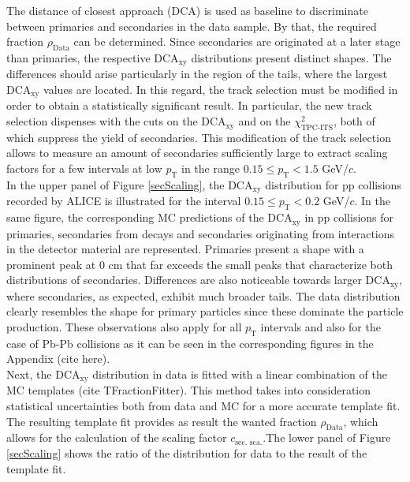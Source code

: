 \documentclass[12pt,a4paper]{report}
\begin{document}
The distance of closest approach (DCA) is used as baseline to discriminate between primaries and secondaries in the data sample. By that, the required fraction $\rho_\text{Data}$ can be determined. Since secondaries are originated at a later stage than primaries, the respective DCA$_{\text{xy}}$ distributions present distinct shapes. The differences should arise particularly in the region of the tails, where the largest DCA$_{\text{xy}}$ values are located. In this regard, the track selection must be modified in order to obtain a statistically significant result. In particular, the new track selection dispenses with the cuts on the DCA$_\text{xy}$ and on the  $\chi^2_\text{TPC-ITS}$, both of which suppress the yield of secondaries. This modification of the track selection allows to measure an amount of secondaries sufficiently large to extract scaling factors for a few intervals at low $p_\text{T}$ in the range $0.15 \leq p_\text{T} < 1.5 $ GeV/$c$.\\
In the upper panel of Figure \ref{secScaling}, the DCA$_{\text{xy}}$ distribution for pp collisions recorded by ALICE is illustrated for the \pt interval $0.15 \leq p_\text{T} < 0.2 $ GeV/$c$. In the same figure, the corresponding MC predictions of the DCA$_{\text{xy}}$ in pp collisions for primaries, secondaries from decays and secondaries originating from interactions in the detector material are represented. Primaries present a shape with a prominent peak at $0$ cm that far exceeds the small peaks that characterize both distributions of secondaries. Differences are also noticeable towards larger DCA$_{\text{xy}}$, where secondaries, as expected, exhibit much broader tails. The data distribution clearly resembles the shape for primary particles since these dominate the particle production. These observations also apply for all $p_\text{T}$ intervals and also for the case of Pb-Pb collisions as it can be seen in the corresponding figures in the Appendix (cite here). \\
Next, the DCA$_{\text{xy}}$ distribution in data is fitted with a linear combination of the MC templates (cite TFractionFitter). This method takes into consideration statistical uncertainties both from data and MC for a more accurate template fit. The resulting template fit provides as result the wanted fraction $\rho_\text{Data}$, which allows for the calculation of the scaling factor $c_\text{sec. sca.}$.The lower panel of Figure \ref{secScaling} shows the ratio of the distribution for data to the result of the template fit. \\
\end{document}

